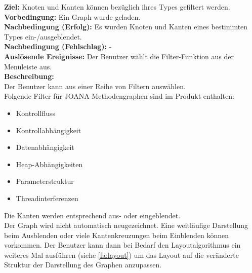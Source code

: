 \label{fa:filter}
\textbf{Ziel:} Knoten und Kanten können bezüglich ihres Types gefiltert werden.\\
\textbf{Vorbedingung:} Ein Graph wurde geladen.\\
\textbf{Nachbedingung (Erfolg):} Es wurden Knoten und Kanten eines bestimmten Types ein-/ausgeblendet.\\
\textbf{Nachbedingung (Fehlschlag):} -\\
\textbf{Auslösende Ereignisse:}
Der Benutzer wählt die Filter-Funktion aus der Menüleiste aus.\\
\textbf{Beschreibung:}\\
Der Benutzer kann aus einer Reihe von Filtern auswählen.\\
Folgende Filter für JOANA-Methodengraphen sind im Produkt enthalten:
\begin{itemize}[nolistsep]
  \item Kontrollfluss
  \item Kontrollabhängigkeit
  \item Datenabhängigkeit
  \item Heap-Abhängigkeiten
  \item Parameterstruktur
  \item Threadinterferenzen
\end{itemize}
Die Kanten werden entsprechend aus- oder eingeblendet.\\
Der Graph wird nicht automatisch neugezeichnet. Eine weitläufige Darstellung beim Ausblenden oder viele Kantenkreuzungen beim Einblenden können vorkommen.
Der Benutzer kann dann bei Bedarf den Layoutalgorithmus ein weiteres Mal ausführen (siehe \ref{fa:layout}) um das Layout auf die
veränderte Struktur der Darstellung des Graphen anzupassen.\\


